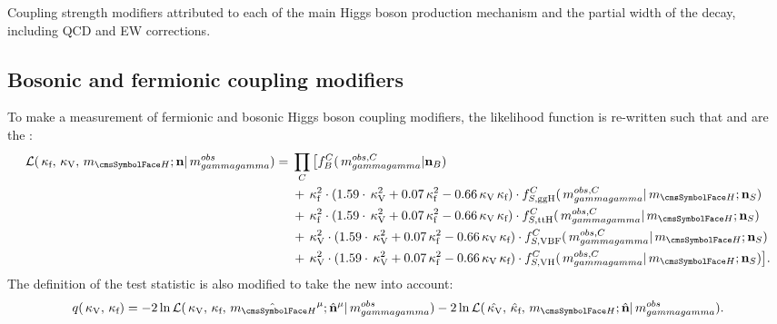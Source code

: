 \begin{table}[h]
 \resizebox{\textwidth}{!}{

}
 \caption{Coupling strength modifiers attributed to each of the main Higgs boson production mechanism \crosssection\s and the partial width of the \Hgg decay, including QCD and EW corrections\quad\cite{Khachatryan:2016vau}.}
 \label{tab:statandresults:kappas}
\end{table}

\subsection{Bosonic and fermionic coupling modifiers}
To make a measurement of fermionic and bosonic Higgs boson coupling modifiers, the likelihood function is re-written such that \kf and \kV are the \POI\s: 
\begin{equation}
\label{eq:statandresults:likelihood_function_kvkf}
\begin{split}
\mathcal{L}(\kf,\kV, \mH; \mathbf{n} | \mgg^{obs} ) ={}&\prod_C \big[  f^C_B(\mgg^{obs,C} | \mathbf{n}_B )  \\ 
& + \kf^2\cdot(1.59\cdot\kV^2 + 0.07\kf^2 - 0.66\kV\kf) \cdot f^C_{S,{\text{ggH}}}(\mgg^{obs,C} |\mH ; \mathbf{n}_S) \\ 
& + \kf^2\cdot(1.59\cdot\kV^2 + 0.07\kf^2 - 0.66\kV\kf) \cdot f^C_{S,{\text{ttH}}}(\mgg^{obs,C} |\mH ; \mathbf{n}_S)  \\ 
& + \kV^2\cdot(1.59\cdot\kV^2 + 0.07\kf^2 - 0.66\kV\kf) \cdot f^C_{S,{\text{VBF}}}(\mgg^{obs,C} |\mH ; \mathbf{n}_S)  \\
& + \kV^2\cdot(1.59\cdot\kV^2 + 0.07\kf^2 - 0.66\kV\kf) \cdot f^C_{S,{\text{VH}}}(\mgg^{obs,C} |\mH ; \mathbf{n}_S)   \big]. 
\end{split}
\end{equation}
The definition of the test statistic is also modified to take the new \POI\s into account:
\begin{equation}
\label{eq:statandresults:test_statistic_kvkf}
 q(\kV,\kf)= -2 \ln \mathcal{L}(\kV,\kf,\hat{\mH}^{\mu}; \hat{\mathbf{n}}^{\mu}| \mgg^{obs})- 2\ln\mathcal{L}(\hat{\kV},\hat{\kf},\mH;\hat{\mathbf{n}}| \mgg^{obs} ).
\end{equation}

